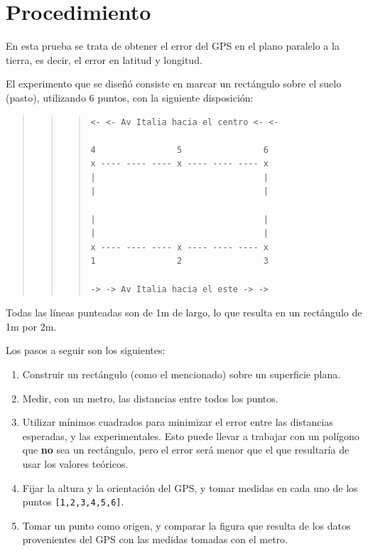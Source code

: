 \documentclass[spanish,12pt,a4paper,titlepage]{report}
\begin{document}
\newpage
\section{Procedimiento}
\label{sec:procedimiento}

En esta prueba se trata de obtener el error del GPS en el plano paralelo a la tierra, es decir, el error en latitud y longitud.

El experimento que se diseñó consiste en marcar un rectángulo sobre el suelo (pasto), utilizando 6 puntos, con la siguiente disposición:

\begin{quote}
\begin{quote}
\begin{quote}
\begin{verbatim}
<- <- Av Italia hacia el centro <- <-

4                5                6
x ---- ---- ---- x ---- ---- ---- x
|                                 |
|                                 |

|                                 |
|                                 |
x ---- ---- ---- x ---- ---- ---- x
1                2                3

-> -> Av Italia hacia el este -> ->
\end{verbatim}
\end{quote}
\end{quote}
\end{quote}

Todas las líneas punteadas son de 1m de largo, lo que resulta en un rectángulo de 1m por 2m.

Los pasos a seguir son los siguientes:

\begin{enumerate}
\item Construir un rectángulo (como el mencionado) sobre un superficie plana.
\item Medir, con un metro, las distancias entre todos los puntos.
\item Utilizar mínimos cuadrados para minimizar el error entre las distancias esperadas, y las experimentales. Esto puede llevar a trabajar con un polígono que \textbf{no} sea un rectángulo, pero el error será menor que el que resultaría de usar los valores teóricos.
\item Fijar la altura y la orientación del GPS, y tomar medidas en cada uno de los puntos \verb+[1,2,3,4,5,6]+.
\item Tomar un punto como origen, y comparar la figura que resulta de los datos provenientes del GPS con las medidas tomadas con el metro.
\end{enumerate}
\end{document}

